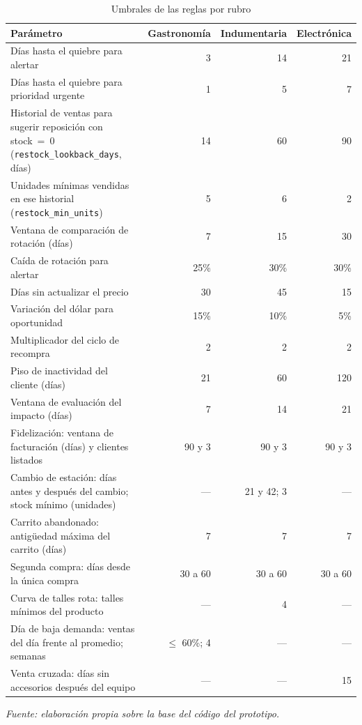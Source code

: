 \begin{table}[!htbp]
\centering
\caption{Umbrales de las reglas por rubro}
\label{tab:motor-umbrales}
\renewcommand{\arraystretch}{1.3}
\footnotesize
\setlength{\tabcolsep}{4pt}
\begin{tabular}{|>{\raggedright\arraybackslash}m{6.4cm}|r|r|r|}
\hline
\textbf{Parámetro} & \textbf{Gastronomía} & \textbf{Indumentaria} & \textbf{Electrónica} \\
\hline
Días hasta el quiebre para alertar & 3 & 14 & 21 \\
\hline
Días hasta el quiebre para prioridad urgente & 1 & 5 & 7 \\
\hline
Historial de ventas para sugerir reposición con stock~=~0 (\texttt{restock\_lookback\_days}, días) & 14 & 60 & 90 \\
\hline
Unidades mínimas vendidas en ese historial (\texttt{restock\_min\_units}) & 5 & 6 & 2 \\
\hline
Ventana de comparación de rotación (días) & 7 & 15 & 30 \\
\hline
Caída de rotación para alertar & 25\% & 30\% & 30\% \\
\hline
Días sin actualizar el precio & 30 & 45 & 15 \\
\hline
Variación del dólar para oportunidad & 15\% & 10\% & 5\% \\
\hline
Multiplicador del ciclo de recompra & 2 & 2 & 2 \\
\hline
Piso de inactividad del cliente (días) & 21 & 60 & 120 \\
\hline
Ventana de evaluación del impacto (días) & 7 & 14 & 21 \\
\hline
Fidelización: ventana de facturación (días) y clientes listados & 90 y 3 & 90 y 3 & 90 y 3 \\
\hline
Cambio de estación: días antes y después del cambio; stock mínimo (unidades) & --- & 21 y 42; 3 & --- \\
\hline
Carrito abandonado: antigüedad máxima del carrito (días) & 7 & 7 & 7 \\
\hline
Segunda compra: días desde la única compra & 30 a 60 & 30 a 60 & 30 a 60 \\
\hline
Curva de talles rota: talles mínimos del producto & --- & 4 & --- \\
\hline
Día de baja demanda: ventas del día frente al promedio; semanas & $\le$ 60\%; 4 & --- & --- \\
\hline
Venta cruzada: días sin accesorios después del equipo & --- & --- & 15 \\
\hline
\end{tabular}

\smallskip
\noindent\textit{Fuente: elaboración propia sobre la base del código del prototipo.}
\end{table}

